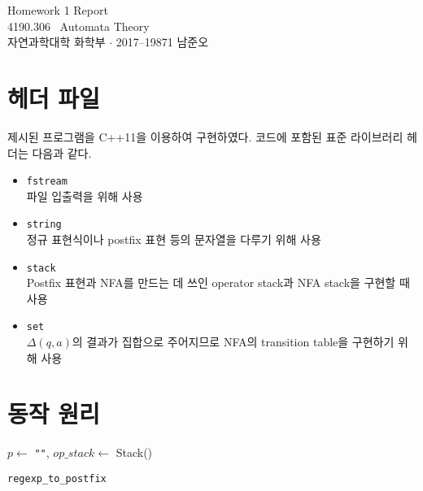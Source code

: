 \documentclass{article}
\begin{document}
\begin{center}
	\LARGE \textsf{Homework 1 Report}\\
	\Large \textsf{4190.306~ Automata Theory}\\ \vspace{0.15cm}
	\large \textsf{자연과학대학 화학부 $\cdot$ 2017--19871 남준오}\\
	\normalsize
	\vspace{1cm}
\end{center}

\begin{multicols}{2}

\section{헤더 파일}
제시된 프로그램을 \textsf{C++11}을 이용하여 구현하였다. 코드에 포함된 표준 라이브러리 헤더는 다음과 같다. 
\begin{itemize}[nolistsep]
	\item \texttt{fstream}\\파일 입출력을 위해 사용
	\item \texttt{string}\\정규 표현식이나 postfix 표현 등의 문자열을 다루기 위해 사용
	\item \texttt{stack}\\Postfix 표현과 NFA를 만드는 데 쓰인 operator stack과 NFA stack을 구현할 때 사용
	\item \texttt{set}\\$\Delta(q, a)$의 결과가 집합으로 주어지므로 NFA의 transition table을 구현하기 위해 사용
\end{itemize}

\section{동작 원리}
\begin{algorithm}[H]
	$p \leftarrow$ \texttt{""}, $op\_stack \leftarrow$ \textsf{Stack}()\\
	\caption{\texttt{regexp\_to\_postfix}\label{r2p}}
\end{algorithm}


\end{multicols}
\end{document}
